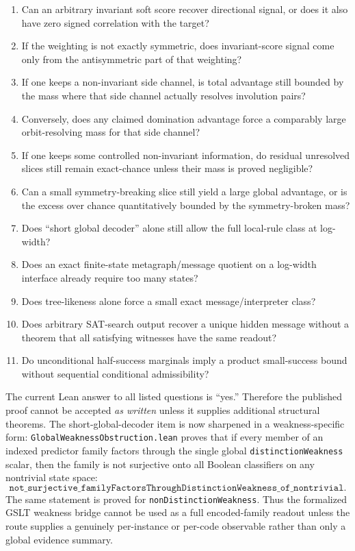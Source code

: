 \documentclass[11pt]{article}
\theoremstyle{remark}
\begin{document}
\begin{enumerate}[leftmargin=1.5em]
  \item Can an arbitrary invariant soft score recover directional signal, or does it also have zero
  signed correlation with the target?
  \item If the weighting is not exactly symmetric, does invariant-score signal come only from the
  antisymmetric part of that weighting?
  \item If one keeps a non-invariant side channel, is total advantage still bounded by the mass
  where that side channel actually resolves involution pairs?
  \item Conversely, does any claimed domination advantage force a comparably large orbit-resolving
  mass for that side channel?
  \item If one keeps some controlled non-invariant information, do residual unresolved slices still
  remain exact-chance unless their mass is proved negligible?
  \item Can a small symmetry-breaking slice still yield a large global advantage, or is the excess
  over chance quantitatively bounded by the symmetry-broken mass?
  \item Does ``short global decoder'' alone still allow the full local-rule class at log-width?
  \item Does an exact finite-state metagraph/message quotient on a log-width interface already
  require too many states?
  \item Does tree-likeness alone force a small exact message/interpreter class?
  \item Does arbitrary SAT-search output recover a unique hidden message without a theorem that all
  satisfying witnesses have the same readout?
  \item Do unconditional half-success marginals imply a product small-success bound without
  sequential conditional admissibility?
\end{enumerate}

The current Lean answer to all listed questions is ``yes.''  Therefore the published proof cannot be
accepted \emph{as written} unless it supplies additional structural theorems.
The short-global-decoder item is now sharpened in a weakness-specific form:
\texttt{GlobalWeaknessObstruction.lean} proves that if every member of an indexed
predictor family factors through the single global
\texttt{distinctionWeakness} scalar, then the family is not surjective onto
all Boolean classifiers on any nontrivial state space:
\[
  \texttt{not\_surjective\_familyFactorsThroughDistinctionWeakness\_of\_nontrivial}.
\]
The same statement is proved for \texttt{nonDistinctionWeakness}.  Thus the
formalized GSLT weakness bridge cannot be used as a full encoded-family
readout unless the route supplies a genuinely per-instance or per-code
observable rather than only a global evidence summary.
\end{document}
